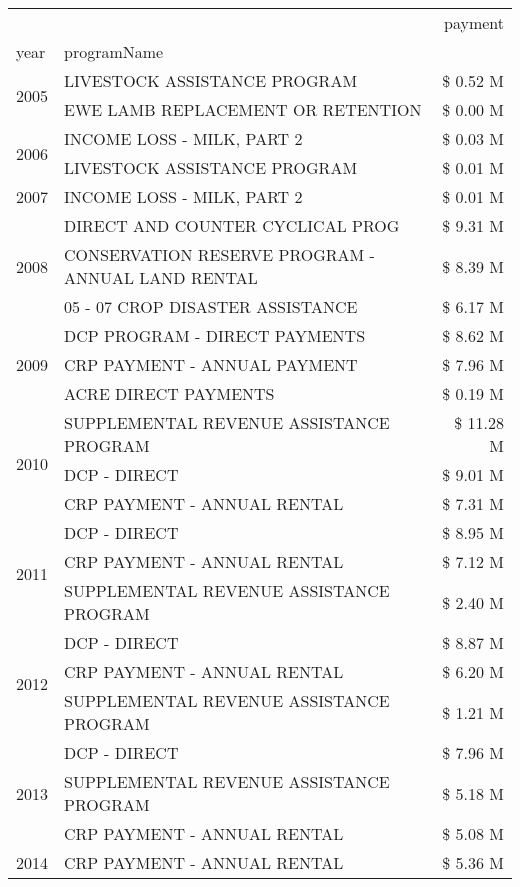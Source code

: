 \begin{tabular}{llr}
\toprule
 &  & payment \\
year & programName &  \\
\midrule
\multirow[t]{2}{*}{2005} & LIVESTOCK ASSISTANCE PROGRAM & \$ 0.52 M \\
 & EWE LAMB REPLACEMENT OR RETENTION & \$ 0.00 M \\
\cline{1-3}
\multirow[t]{2}{*}{2006} & INCOME LOSS - MILK, PART 2 & \$ 0.03 M \\
 & LIVESTOCK ASSISTANCE PROGRAM & \$ 0.01 M \\
\cline{1-3}
2007 & INCOME LOSS - MILK, PART 2 & \$ 0.01 M \\
\cline{1-3}
\multirow[t]{3}{*}{2008} & DIRECT AND COUNTER CYCLICAL PROG & \$ 9.31 M \\
 & CONSERVATION RESERVE PROGRAM - ANNUAL LAND RENTAL & \$ 8.39 M \\
 & 05 - 07 CROP DISASTER ASSISTANCE & \$ 6.17 M \\
\cline{1-3}
\multirow[t]{3}{*}{2009} & DCP PROGRAM - DIRECT PAYMENTS & \$ 8.62 M \\
 & CRP PAYMENT - ANNUAL PAYMENT & \$ 7.96 M \\
 & ACRE DIRECT PAYMENTS & \$ 0.19 M \\
\cline{1-3}
\multirow[t]{3}{*}{2010} & SUPPLEMENTAL REVENUE ASSISTANCE PROGRAM & \$ 11.28 M \\
 & DCP - DIRECT & \$ 9.01 M \\
 & CRP PAYMENT - ANNUAL RENTAL & \$ 7.31 M \\
\cline{1-3}
\multirow[t]{3}{*}{2011} & DCP - DIRECT & \$ 8.95 M \\
 & CRP PAYMENT - ANNUAL RENTAL & \$ 7.12 M \\
 & SUPPLEMENTAL REVENUE ASSISTANCE PROGRAM & \$ 2.40 M \\
\cline{1-3}
\multirow[t]{3}{*}{2012} & DCP - DIRECT & \$ 8.87 M \\
 & CRP PAYMENT - ANNUAL RENTAL & \$ 6.20 M \\
 & SUPPLEMENTAL REVENUE ASSISTANCE PROGRAM & \$ 1.21 M \\
\cline{1-3}
\multirow[t]{3}{*}{2013} & DCP - DIRECT & \$ 7.96 M \\
 & SUPPLEMENTAL REVENUE ASSISTANCE PROGRAM & \$ 5.18 M \\
 & CRP PAYMENT - ANNUAL RENTAL & \$ 5.08 M \\
\cline{1-3}
\multirow[t]{3}{*}{2014} & CRP PAYMENT - ANNUAL RENTAL & \$ 5.36 M \\

\end{tabular}
